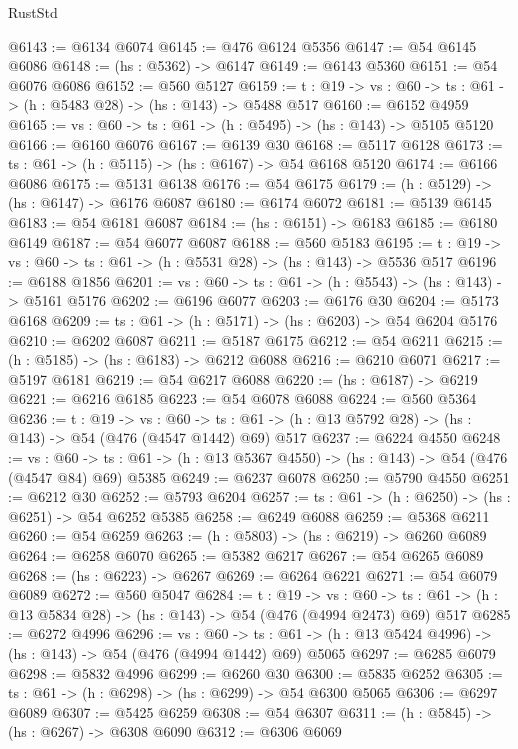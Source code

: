 \begin{lexlean}{RustStd}
\begin{coremodule}
@6143 := @6134 @6074
@6145 := @476 @6124 @5356
@6147 := @54 @6145 @6086
@6148 := (hs : @5362) -> @6147
@6149 := @6143 @5360
@6151 := @54 @6076 @6086
@6152 := @560 @5127
@6159 := {t : @19} -> {vs : @60} -> {ts : @61} -> (h : @5483 @28) -> (hs : @143) -> @5488 @517
@6160 := @6152 @4959
@6165 := {vs : @60} -> {ts : @61} -> (h : @5495) -> (hs : @143) -> @5105 @5120
@6166 := @6160 @6076
@6167 := @6139 @30
@6168 := @5117 @6128
@6173 := {ts : @61} -> (h : @5115) -> (hs : @6167) -> @54 @6168 @5120
@6174 := @6166 @6086
@6175 := @5131 @6138
@6176 := @54 @6175
@6179 := (h : @5129) -> (hs : @6147) -> @6176 @6087
@6180 := @6174 @6072
@6181 := @5139 @6145
@6183 := @54 @6181 @6087
@6184 := (hs : @6151) -> @6183
@6185 := @6180 @6149
@6187 := @54 @6077 @6087
@6188 := @560 @5183
@6195 := {t : @19} -> {vs : @60} -> {ts : @61} -> (h : @5531 @28) -> (hs : @143) -> @5536 @517
@6196 := @6188 @1856
@6201 := {vs : @60} -> {ts : @61} -> (h : @5543) -> (hs : @143) -> @5161 @5176
@6202 := @6196 @6077
@6203 := @6176 @30
@6204 := @5173 @6168
@6209 := {ts : @61} -> (h : @5171) -> (hs : @6203) -> @54 @6204 @5176
@6210 := @6202 @6087
@6211 := @5187 @6175
@6212 := @54 @6211
@6215 := (h : @5185) -> (hs : @6183) -> @6212 @6088
@6216 := @6210 @6071
@6217 := @5197 @6181
@6219 := @54 @6217 @6088
@6220 := (hs : @6187) -> @6219
@6221 := @6216 @6185
@6223 := @54 @6078 @6088
@6224 := @560 @5364
@6236 := {t : @19} ->
  {vs : @60} ->
  {ts : @61} -> (h : @13 @5792 @28) -> (hs : @143) -> @54 (@476 (@4547 @1442) @69) @517
@6237 := @6224 @4550
@6248 := {vs : @60} ->
  {ts : @61} -> (h : @13 @5367 @4550) -> (hs : @143) -> @54 (@476 (@4547 @84) @69) @5385
@6249 := @6237 @6078
@6250 := @5790 @4550
@6251 := @6212 @30
@6252 := @5793 @6204
@6257 := {ts : @61} -> (h : @6250) -> (hs : @6251) -> @54 @6252 @5385
@6258 := @6249 @6088
@6259 := @5368 @6211
@6260 := @54 @6259
@6263 := (h : @5803) -> (hs : @6219) -> @6260 @6089
@6264 := @6258 @6070
@6265 := @5382 @6217
@6267 := @54 @6265 @6089
@6268 := (hs : @6223) -> @6267
@6269 := @6264 @6221
@6271 := @54 @6079 @6089
@6272 := @560 @5047
@6284 := {t : @19} ->
  {vs : @60} ->
  {ts : @61} -> (h : @13 @5834 @28) -> (hs : @143) -> @54 (@476 (@4994 @2473) @69) @517
@6285 := @6272 @4996
@6296 := {vs : @60} ->
  {ts : @61} -> (h : @13 @5424 @4996) -> (hs : @143) -> @54 (@476 (@4994 @1442) @69) @5065
@6297 := @6285 @6079
@6298 := @5832 @4996
@6299 := @6260 @30
@6300 := @5835 @6252
@6305 := {ts : @61} -> (h : @6298) -> (hs : @6299) -> @54 @6300 @5065
@6306 := @6297 @6089
@6307 := @5425 @6259
@6308 := @54 @6307
@6311 := (h : @5845) -> (hs : @6267) -> @6308 @6090
@6312 := @6306 @6069

\end{coremodule}
\end{lexlean}
